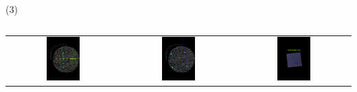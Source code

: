 \begin{frame}{ (3)}
\begin{columns}
\begin{column}{0.50\textwidth}
\begin{center}
\begin{tabular}{ccc}
         \includegraphics[width=0.31\textwidth]{2022_ConteoMicroAlgas/figs/04_LineasProbabilistico}&
         \includegraphics[width=0.31\textwidth]{2022_ConteoMicroAlgas/figs/05_Delimitacion}&
         \includegraphics[width=0.31\textwidth]{2022_ConteoMicroAlgas/figs/07_ResultadoConteo}\\

          \end{tabular}
\end{center}
\end{column} 
\end{columns} 
\end{frame}



